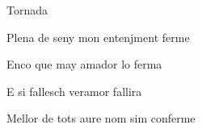 \documentclass[12pt]{article}
\begin{document}
\begin{estrofaExtra}%




\begin{tornada}

\textsection{}Tornada\textsection{}

\end{tornada}


\end{estrofaExtra}


\begin{estrofa}

 Plena de seny mon entenjment ferme

 Enco que may amador lo ferma

 E si fallesch veramor fallira

 Mellor de tots aure nom sim conferme

\end{estrofa}
\end{document}
